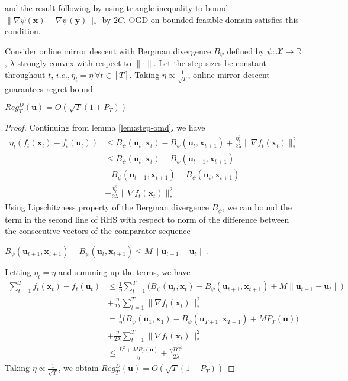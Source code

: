\documentclass[12pt, a4paper]{report}
\begin{document}
and the result following by using triangle inequality to bound $\lVert \nabla\psi(\mathbf{x}) - \nabla\psi(\mathbf{y}) \rVert_*$ by $2C$. OGD on bounded feasible domain satisfies this condition.
\begin{thm}
\label{thm:mirror-dynamic}
Consider online mirror descent with Bergman divergence $B_\psi$ defined by $\psi : \mathcal{X} \rightarrow \mathbb{R}$, $\lambda$-strongly convex with respect to $\lVert \cdot \rVert$.
Let the step sizes be constant throughout $t$, $i.e., \eta_t = \eta\ \forall t \in [T]$. Taking $\eta \propto \frac{1}{\sqrt{T}}$, online mirror descent guarantees regret bound
\begin{center}
    $Reg_{T}^{D}(\mathbf{u}) = O(\sqrt{T}(1 + P_T))$
\end{center}
\end{thm}
\begin{proof}
Continuing from lemma \ref{lem:step-omd}, we have
\begin{align*}
    \eta_t(f_t(\mathbf{x}_t) - f_t(\mathbf{u}_t)) &\leq B_\psi(\mathbf{u}_t, \mathbf{x}_t) - B_\psi(\mathbf{u}_t, \mathbf{x}_{t+1}) + \frac{\eta_t^2}{2\lambda} \lVert \nabla f_t(\mathbf{x}_t) \rVert_*^2
    \\ 
    &\leq B_\psi(\mathbf{u}_t, \mathbf{x}_t) - B_\psi(\mathbf{u}_{t+1}, \mathbf{x}_{t+1})
    \\
    &+ B_\psi(\mathbf{u}_{t+1}, \mathbf{x}_{t+1}) - B_\psi(\mathbf{u}_t, \mathbf{x}_{t+1})
    \\
    &+ \frac{\eta_t^2}{2\lambda} \lVert \nabla f_t(\mathbf{x}_t) \rVert_*^2
\end{align*}
Using Lipschitzness property of the Bergman divergence $B_\psi$, we can bound the term in the second line of RHS with respect to norm of the difference between the consecutive vectors of the comparator sequence
\begin{center}
    $B_\psi(\mathbf{u}_{t+1}, \mathbf{x}_{t+1}) - B_\psi(\mathbf{u}_t, \mathbf{x}_{t+1}) \leq M\lVert \mathbf{u}_{t+1} - \mathbf{u}_t \rVert$.
\end{center}

Letting $\eta_t = \eta$ and summing up the terms, we have
\begin{align*}
    \sum_{t=1}^T f_t(\mathbf{x}_t) - f_t(\mathbf{u}_t) &\leq \frac{1}{\eta} \sum_{t=1}^T \Big(B_\psi(\mathbf{u}_t, \mathbf{x}_t) - B_\psi(\mathbf{u}_{t+1}, \mathbf{x}_{t+1}) + M \lVert \mathbf{u}_{t+1} - \mathbf{u}_t \rVert \Big) 
    \\
    &+ \frac{\eta}{2\lambda} \sum_{t=1}^T \lVert \nabla f_t(\mathbf{x}_t) \rVert_*^2
    \\
    &= \frac{1}{\eta} \Big(B_\psi(\mathbf{u}_1, \mathbf{x}_1) - B_\psi(\mathbf{u}_{T+1}, \mathbf{x}_{T+1}) + MP_T(\mathbf{u})\Big) 
    \\
    &+ \frac{\eta}{2\lambda}\sum_{t=1}^T\lVert \nabla f_t(\mathbf{x}_t)\rVert_*^2
    \\
    &\leq \frac{L^2 + MP_T(\mathbf{u})}{\eta} + \frac{\eta TG^2}{2\lambda}
\end{align*}
Taking $\eta \propto \frac{1}{\sqrt{T}}$, we obtain $Reg_T^D(\mathbf{u}) = O(\sqrt{T}(1 + P_T))$
\end{proof}
\end{document}
